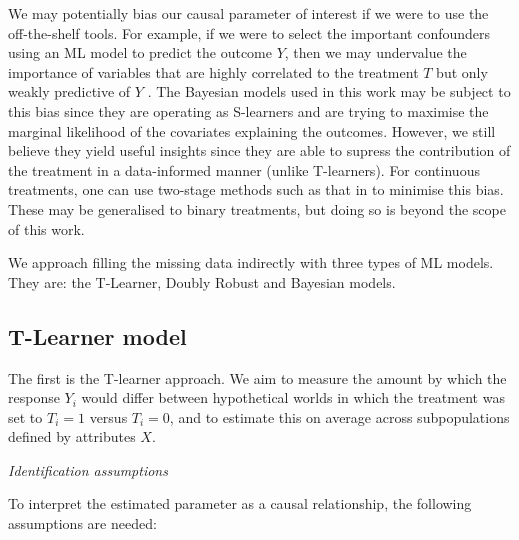 \documentclass[12pt, a4paper]{article}
\begin{document}
We may potentially bias our causal parameter of interest if we were to use the off-the-shelf tools. For example, if we were to select the important confounders using an ML model to predict the outcome $Y$, then we may undervalue the importance of variables that are highly correlated to the treatment $T$ but only weakly predictive of $Y$ \citep{cherno2018}. The Bayesian models used in this work may be subject to this bias since they are operating as S-learners and are trying to maximise the marginal likelihood of the covariates explaining the outcomes. However, we still believe they yield useful insights since they are able to supress the contribution of the treatment in a data-informed manner (unlike T-learners). For continuous treatments, one can use
two-stage methods such as that in \citet{hahn2018} to minimise this bias. These may be generalised to binary treatments, but doing so is beyond the scope of this work. 

We approach filling the missing data indirectly with three types of ML models. They are: the T-Learner, Doubly Robust and Bayesian models. 


\subsection{T-Learner model}

The first is the T-learner approach. We aim to measure the amount by which the response $Y_i$ would differ between hypothetical worlds in which the treatment was set to $T_i=1$ versus $T_i=0$, and to estimate this on average across subpopulations defined by attributes $X$. 

\emph{Identification assumptions}

To interpret the estimated parameter as a causal relationship, the following assumptions are needed:
\end{document}
